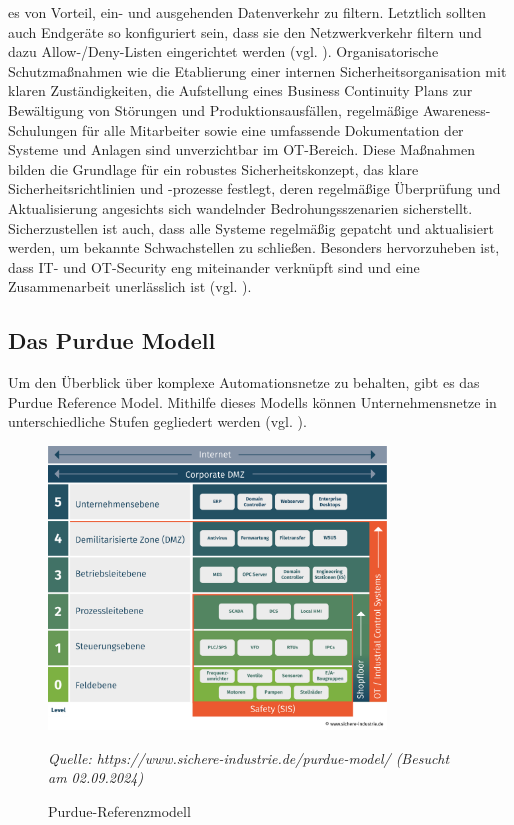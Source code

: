 es von Vorteil, ein- und ausgehenden Datenverkehr zu filtern. Letztlich sollten auch Endgeräte so konfiguriert sein, dass sie den Netzwerkverkehr filtern und dazu Allow-/Deny-Listen eingerichtet werden (vgl. \cite{mitre}). 
\noindent Organisatorische Schutzmaßnahmen wie die Etablierung einer internen Sicherheitsorganisation mit klaren Zuständigkeiten, die Aufstellung eines Business Continuity Plans zur Bewältigung von Störungen und Produktionsausfällen, regelmäßige Awareness-Schulungen für alle Mitarbeiter sowie eine umfassende Dokumentation der Systeme und Anlagen sind unverzichtbar im OT-Bereich. Diese Maßnahmen bilden die Grundlage für ein robustes Sicherheitskonzept, das klare Sicherheitsrichtlinien und -prozesse festlegt, deren regelmäßige Überprüfung und Aktualisierung angesichts sich wandelnder Bedrohungsszenarien sicherstellt. Sicherzustellen ist auch, dass alle Systeme regelmäßig gepatcht und aktualisiert werden, um bekannte Schwachstellen zu schließen. Besonders hervorzuheben ist, dass IT- und OT-Security eng miteinander verknüpft sind und eine Zusammenarbeit unerlässlich ist (vgl. \cite{orga}). 

\subsection{Das Purdue Modell}

Um den Überblick über komplexe Automationsnetze zu behalten, gibt es das Purdue Reference Model. Mithilfe dieses Modells können Unternehmensnetze in unterschiedliche Stufen gegliedert werden (vgl. \cite{sichereIndustrie2}).
\begin{figure}[H]
    \centering
    \includegraphics[width=0.8\textwidth]{images/Purdue_Modell.png} %
    \caption{Purdue-Referenzmodell}
    \label{fig:purdue_modell}
    \vspace{0.5em} %
    \centering
    \textit{Quelle: https://www.sichere-industrie.de/purdue-model/ (Besucht am 02.09.2024)} %
\end{figure}


